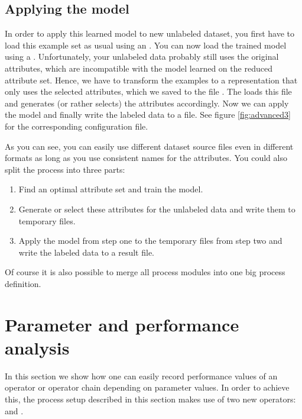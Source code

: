 
\subsection{Applying the model}
In order to apply this learned model to new unlabeled dataset, you
first have to load this example set as usual using an .
   You can now load the trained model using a .
Unfortunately, your unlabeled data probably still uses the original 
attributes, which are incompatible with the model learned on the
reduced attribute set.
   Hence, we have to transform the examples to a representation
that only uses the selected attributes, which we saved to the file 
.
   The  loads this file and generates (or rather
selects) the attributes accordingly.
   Now we can apply the model and finally write the labeled data 
to a file.
See figure \ref{fig:advanced3} for the corresponding configuration file. 

As you can see, you can easily use different dataset source files even in
different formats as long as you use consistent names for the attributes. 
You could also split the process into three parts:
\begin{enumerate}
  \item Find an optimal attribute set and train the model.
  \item Generate or select these attributes for the unlabeled data and
    write them to temporary files.
  \item Apply the model from step one to the temporary files from step
    two and write the labeled data to a result file.
\end{enumerate}

Of course it is also possible to merge all process modules into one big
process definition.





\section{Parameter and performance analysis}
\label{sec:parameter_optimization}
In this section we show how one can easily record performance values
of an operator or operator chain depending on parameter values. 
In order to achieve this, the \rapidminer process setup described in
this section makes use of two new \rapidminer operators: 
 and .

